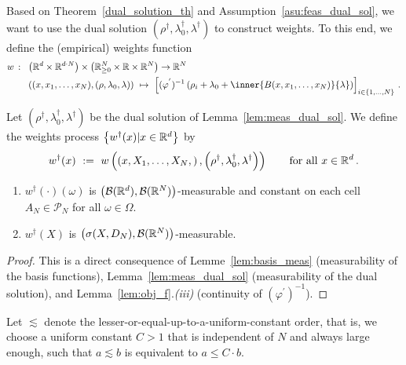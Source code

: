 Based on Theorem~\ref{dual_solution_th}
and Assumption~\ref{asu:feas_dual_sol},
we want to use the dual 
solution 
$
\left( \rho^\dagger,\lambda_0^\dagger,\lambda^\dagger \right)
$
to construct weights.
To this end, we define the (empirical) weights function
\begin{align*}
 w\ \colon\
 &
 \left( 
  \R^d\times \R^{d\cdot N}
 \right)
  \times
  \left( 
\R^N_{\ge 0}\times \R\times \R^N
  \right)
  \to
  \R^N
  \\
 &
  \left( 
  (x,x_1,\ldots,x_N),(\rho,\lambda_0,\lambda)
  \right)
  \ 
  \mapsto
  \ 
  \left[ 
  (\varphi^{'})^{-1}
  \left( 
    \rho_i
    +
    \lambda_0
    +
    \inner
    {B(x,x_1,\ldots,x_N)}
    {\lambda}
  \right)
\right]_{i\in \left\{ 1,\ldots,N \right\}}
\,.
\end{align*}
\begin{definition}
  Let 
  $
\left( \rho^\dagger,\lambda_0^\dagger,\lambda^\dagger \right)
  $
  be the dual solution of Lemma~\ref{lem:meas_dual_sol}.
  We define the weights process 
  $\left\{ w^\dagger(x) | x\in\mathbb{R}^d\right\}$
  by
  \begin{align*}
    w^\dagger(x) 
    \ 
    :=
    \ 
    w
    \left( 
    \left( 
    x,X_1,\ldots,X_N,
    \right)
    ,
\left( \rho^\dagger,\lambda_0^\dagger,\lambda^\dagger \right)
    \right)
    \qquad
    \text{for all}\ 
    x\in\R^d
    \,.
  \end{align*}
\end{definition}
\begin{lemma}
  \label{lem:weights:meas}
  \quad
  \begin{enumerate}[label=(\roman*)]
\item
  $w^\dagger(\cdot)(\omega)$ is 
  $\left(
    \mathcal{B}(\mathbb{R}^d),\mathcal{B}(\mathbb{R}^N)
  \right)$-measurable
  and
  constant on each cell 
  $A_N\in\mathcal{P}_N$
  for all $\omega\in\Omega$. 
\item
  $w^\dagger(X)$ is $\left(
    \sigma(X,D_N),\mathcal{B}(\mathbb{R}^N)
  \right)$-measurable. 
  \end{enumerate}
\end{lemma}
\begin{proof}
  This is a direct consequence of 
  Lemme~\ref{lem:basis_meas} (measurability of the basis functions), Lemma~\ref{lem:meas_dual_sol} (measurability of the dual solution),
  and 
  Lemma~\ref{lem:obj_f}.\textit{(iii)} (continuity of $(\varphi^{'})^{-1}$).
\end{proof}
  Let $\lesssim$ denote the lesser-or-equal-up-to-a-uniform-constant order, that is, we choose a uniform constant $C>1$ that is independent of $N$ and always large enough, such that $a\lesssim b$ is equivalent to $a\le C\cdot b$.
